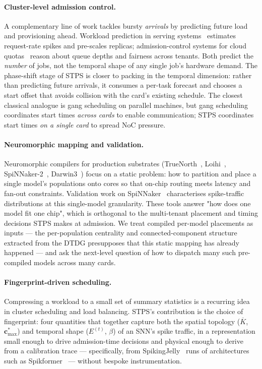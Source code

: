 \documentclass[letterpaper,twocolumn,10pt]{article}
\begin{document}
\paragraph{Cluster-level admission control.}
A complementary line of work tackles bursty \emph{arrivals} by predicting future load and provisioning ahead. Workload prediction in serving systems~\cite{weng2023beware} estimates request-rate spikes and pre-scales replicas; admission-control systems for cloud quotas~\cite{288610} reason about queue depths and fairness across tenants. Both predict the \emph{number} of jobs, not the temporal shape of any single job's hardware demand. The phase-shift stage of STPS is closer to packing in the temporal dimension: rather than predicting future arrivals, it consumes a per-task forecast and chooses a start offset that avoids collision with the card's existing schedule. The closest classical analogue is gang scheduling on parallel machines, but gang scheduling coordinates start times \emph{across cards} to enable communication; STPS coordinates start times \emph{on a single card} to spread NoC pressure.

\paragraph{Neuromorphic mapping and validation.}
Neuromorphic compilers for production substrates (TrueNorth~\cite{merolla2014truenorth}, Loihi~\cite{davies2018loihi, orchard2021loihi2}, SpiNNaker-2~\cite{mayr2019spinnaker2}, Darwin3~\cite{ma2024darwin3}) focus on a static problem: how to partition and place a single model's populations onto cores so that on-chip routing meets latency and fan-out constraints. Validation work on SpiNNaker~\cite{lee2011validating} characterises spike-traffic distributions at this single-model granularity. These tools answer "how does one model fit one chip", which is orthogonal to the multi-tenant placement and timing decisions STPS makes at admission. We treat compiled per-model placements as inputs --- the per-population centrality and connected-component structure extracted from the DTDG presupposes that this static mapping has already happened --- and ask the next-level question of how to dispatch many such pre-compiled models across many cards.

\paragraph{Fingerprint-driven scheduling.}
Compressing a workload to a small set of summary statistics is a recurring idea in cluster scheduling and load balancing. STPS's contribution is the choice of fingerprint: four quantities that together capture both the spatial topology ($\overline{K}$, $\mathbf{c}^{*}_{\max}$) and temporal shape ($E^{(t)}$, $\beta$) of an SNN's spike traffic, in a representation small enough to drive admission-time decisions and physical enough to derive from a calibration trace --- specifically, from SpikingJelly~\cite{fang2023spikingjelly} runs of architectures such as Spikformer~\cite{zhou2023spikformer} --- without bespoke instrumentation.
\end{document}
